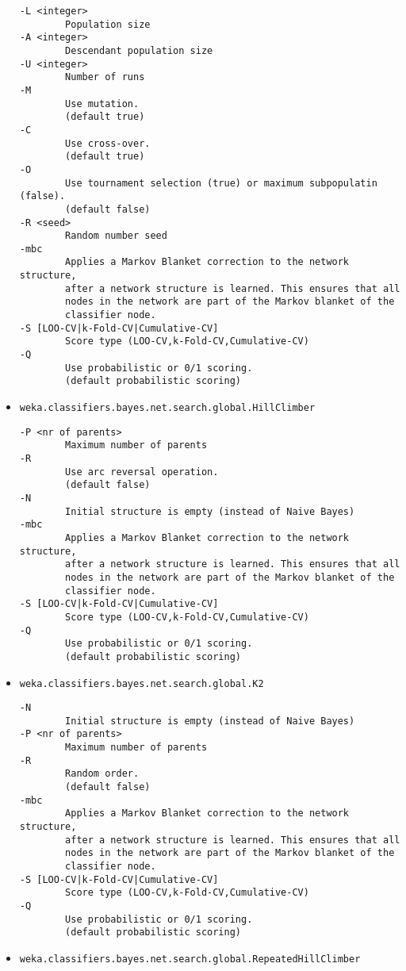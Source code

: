 \begin{itemize}
  \begin{verbatim}
-L <integer>
        Population size
-A <integer>
        Descendant population size
-U <integer>
        Number of runs
-M
        Use mutation.
        (default true)
-C
        Use cross-over.
        (default true)
-O
        Use tournament selection (true) or maximum subpopulatin (false).
        (default false)
-R <seed>
        Random number seed
-mbc
        Applies a Markov Blanket correction to the network structure,
        after a network structure is learned. This ensures that all
        nodes in the network are part of the Markov blanket of the
        classifier node.
-S [LOO-CV|k-Fold-CV|Cumulative-CV]
        Score type (LOO-CV,k-Fold-CV,Cumulative-CV)
-Q
        Use probabilistic or 0/1 scoring.
        (default probabilistic scoring)
  \end{verbatim}
\item \texttt{weka.classifiers.bayes.net.search.global.HillClimber}
  \begin{verbatim}
-P <nr of parents>
        Maximum number of parents
-R
        Use arc reversal operation.
        (default false)
-N
        Initial structure is empty (instead of Naive Bayes)
-mbc
        Applies a Markov Blanket correction to the network structure,
        after a network structure is learned. This ensures that all
        nodes in the network are part of the Markov blanket of the
        classifier node.
-S [LOO-CV|k-Fold-CV|Cumulative-CV]
        Score type (LOO-CV,k-Fold-CV,Cumulative-CV)
-Q
        Use probabilistic or 0/1 scoring.
        (default probabilistic scoring)
  \end{verbatim}
\item \texttt{weka.classifiers.bayes.net.search.global.K2}
  \begin{verbatim}
-N
        Initial structure is empty (instead of Naive Bayes)
-P <nr of parents>
        Maximum number of parents
-R
        Random order.
        (default false)
-mbc
        Applies a Markov Blanket correction to the network structure,
        after a network structure is learned. This ensures that all
        nodes in the network are part of the Markov blanket of the
        classifier node.
-S [LOO-CV|k-Fold-CV|Cumulative-CV]
        Score type (LOO-CV,k-Fold-CV,Cumulative-CV)
-Q
        Use probabilistic or 0/1 scoring.
        (default probabilistic scoring)
  \end{verbatim}
\item \texttt{weka.classifiers.bayes.net.search.global.RepeatedHillClimber}
  \begin{verbatim}

\end{verbatim}
\end{itemize}
